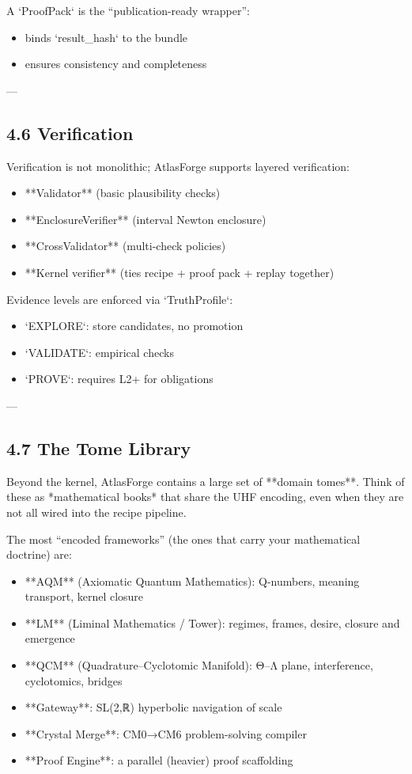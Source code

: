 \documentclass[11pt]{article}
\begin{document}
A `ProofPack` is the “publication-ready wrapper”:
\begin{itemize}
\item binds `result\_hash` to the bundle
\item ensures consistency and completeness
\end{itemize}

---

\subsection{4.6 Verification}

Verification is not monolithic; AtlasForge supports layered verification:

\begin{itemize}
\item **Validator** (basic plausibility checks)
\item **EnclosureVerifier** (interval Newton enclosure)
\item **CrossValidator** (multi-check policies)
\item **Kernel verifier** (ties recipe + proof pack + replay together)
\end{itemize}

Evidence levels are enforced via `TruthProfile`:
\begin{itemize}
\item `EXPLORE`: store candidates, no promotion
\item `VALIDATE`: empirical checks
\item `PROVE`: requires L2+ for obligations
\end{itemize}

---

\subsection{4.7 The Tome Library}

Beyond the kernel, AtlasForge contains a large set of **domain tomes**.  
Think of these as *mathematical books* that share the UHF encoding, even when they are not all wired into the recipe pipeline.

The most “encoded frameworks” (the ones that carry your mathematical doctrine) are:

\begin{itemize}
\item **AQM** (Axiomatic Quantum Mathematics): Q-numbers, meaning transport, kernel closure
\item **LM** (Liminal Mathematics / Tower): regimes, frames, desire, closure and emergence
\item **QCM** (Quadrature–Cyclotomic Manifold): Θ–Λ plane, interference, cyclotomics, bridges
\item **Gateway**: SL(2,ℝ) hyperbolic navigation of scale
\item **Crystal Merge**: CM0→CM6 problem-solving compiler
\item **Proof Engine**: a parallel (heavier) proof scaffolding
\end{itemize}
\end{document}
